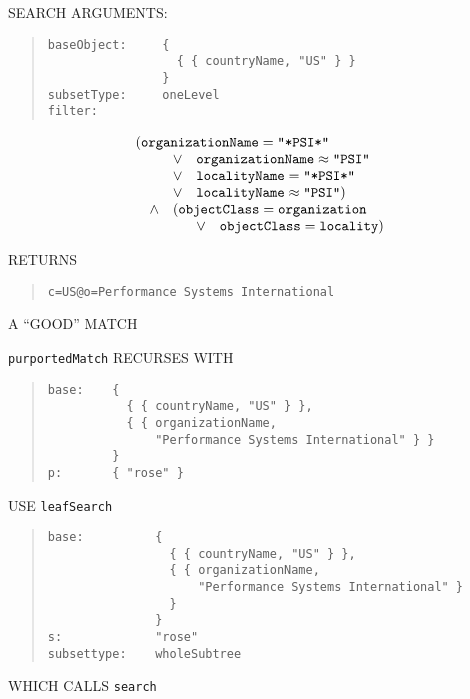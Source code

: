 \begin{bwslide}

\begin{nrtc}
\item	SEARCH ARGUMENTS:
\begin{quote}\small\begin{verbatim}
baseObject:     {
                  { { countryName, "US" } }
                }
subsetType:     oneLevel
filter:
\end{verbatim}\end{quote}
\[\begin{array}{lllll}
\multicolumn{5}{l}{(\mbox{\tt organizationName}=\mbox{\tt "*PSI*"}}\\
&	&	\lor&	\multicolumn{2}{l}{\mbox{\tt organizationName}\approx\mbox{\tt "PSI"}}\\
&	&	\lor&	\multicolumn{2}{l}{\mbox{\tt localityName}=\mbox{\tt "*PSI*"}}\\
&	&	\lor&	\multicolumn{2}{l}{\mbox{\tt localityName}\approx\mbox{\tt "PSI"})}\\
&	\land&	\multicolumn{3}{l}{(\mbox{\tt objectClass}=\mbox{\tt organization}}\\
&	&	&	\lor&	    \mbox{\tt objectClass}=\mbox{\tt locality})\\
\end{array}\]

\item	RETURNS
\begin{quote}\small\begin{verbatim}
c=US@o=Performance Systems International
\end{verbatim}\end{quote}
A ``GOOD'' MATCH
\end{nrtc}
\end{bwslide}


\begin{bwslide}

\begin{nrtc}
\item	\verb"purportedMatch" RECURSES WITH
\begin{quote}\small\begin{verbatim}
base:    {
           { { countryName, "US" } },
           { { organizationName,
               "Performance Systems International" } }
         }
p:       { "rose" }
\end{verbatim}\end{quote}

\item	USE \verb"leafSearch"
\begin{quote}\small\begin{verbatim}
base:          {
                 { { countryName, "US" } },
                 { { organizationName,
                     "Performance Systems International" }
                 }
               }
s:             "rose"
subsettype:    wholeSubtree
\end{verbatim}\end{quote}
WHICH CALLS \verb"search"
\end{nrtc}
\end{bwslide}


